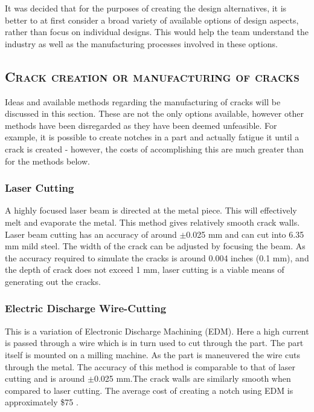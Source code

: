 \documentclass[12pt]{article}
\begin{document}
It was decided that for the purposes of creating the design alternatives, it is better to at first consider a broad variety of available options of design aspects, rather than focus on individual designs. This would help the team understand the industry as well as the manufacturing processes involved in these options. 

 
\subsection{\textsc{Crack creation or manufacturing of cracks}}

Ideas and available methods regarding the manufacturing of cracks will be discussed in this section. These are not the only options available, however other methods have been disregarded as they have been deemed unfeasible. For example, it is possible to create notches in a part and actually fatigue it until a crack is created - however, the costs of accomplishing this are much greater than for the methods below.

\subsubsection{Laser Cutting}
A highly focused laser beam is directed at the metal piece. This will effectively melt and evaporate the metal. This method gives relatively smooth crack walls. Laser beam cutting has an accuracy of around $\pm$0.025 mm and can cut into 6.35 mm mild steel. The width of the crack can be adjusted by focusing the beam. As the accuracy required to simulate the cracks is around 0.004 inches (0.1 mm), and the depth of crack does not exceed 1 mm, laser cutting is a viable means of generating out the cracks.

\subsubsection{Electric Discharge Wire-Cutting}
This is a variation of Electronic Discharge Machining (EDM). Here a high current is passed through a wire which is in turn used to cut through the part. The part itself is mounted on a milling machine. As the part is maneuvered the wire cuts through the metal. The accuracy of this method is comparable to that of laser cutting and is around $\pm$0.025 mm.The crack walls are similarly smooth when compared to laser cutting. The average cost of creating a notch using EDM is approximately \$75 .
\end{document}
